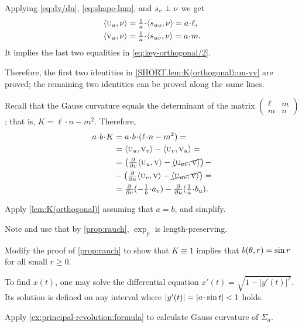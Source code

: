 \begin{multicols}{2}
Applying \ref{eq:dv/du}, \ref{eq:shape-lmn}, and $s_v\perp\nu$ we get
\begin{align*}
\langle\vec u_u,\Norm\rangle
&=
\tfrac1{a}\cdot \langle s_{uu},\Norm\rangle
=a\cdot \ell,
\\
\langle\vec v_u,\Norm\rangle
&=
\tfrac1{a}\cdot \langle s_{uv},\Norm\rangle
=a\cdot m.
\end{align*}
It implies the last two equalities in \ref{eq:key-orthogonal/2}.

Therefore, the first two identities in \ref{SHORT.lem:K(orthogonal):uu-vv} are proved;
the remaining two identities can be proved along the same lines.

Recall that the Gauss curvature equals the determinant of the matrix $
(\begin{smallmatrix}
\ell&m
\\
m&n
\end{smallmatrix}
)
$;
that is, $K=\ell\cdot n-m^2$.
Therefore, 
\begin{align*}
a\cdot b\cdot K
&=
a\cdot b\cdot(\ell\cdot n-m^2)
=
\\
&=
\langle\vec u_u,\vec v_v\rangle 
-
\langle\vec u_v,\vec v_u\rangle= 
\\
&= 
\left(
\tfrac{\partial}{\partial v}
\langle\vec u_u,\vec v\rangle
-
\cancel{\langle\vec u_{uv},\vec v\rangle}
\right)-
\\
&-
\left(
\tfrac{\partial}{\partial u}
\langle\vec u_v,\vec v\rangle
-
\cancel{\langle\vec u_{uv},\vec v\rangle}
\right)=
\\
&=\tfrac{\partial}{\partial v}(-\tfrac1{b}\cdot a_v)
-
\tfrac{\partial}{\partial u}(\tfrac1{a}\cdot b_u).
\end{align*}

Apply \ref{lem:K(orthogonal)} assuming that $a=b$, and simplify.

Note and use that by \ref{prop:rauch}, $\exp_p$ is length-preserving.

 Modify the proof of \ref{prop:rauch} to show that $K\equiv 1$ implies that $b(\theta,r)\z=\sin r$ for all small $r\ge 0$.



To find $x(t)$, one may solve the differential equation
$x'(t)=\sqrt{1-|y'(t)|^2}$.
Its solution is defined on any interval where $|y'(t)|\z=|a\cdot \sin t|<1$ holds.

Apply \ref{ex:principal-revolution:formula} to calculate Gauss curvature of $\Sigma_a$.


\end{multicols}
